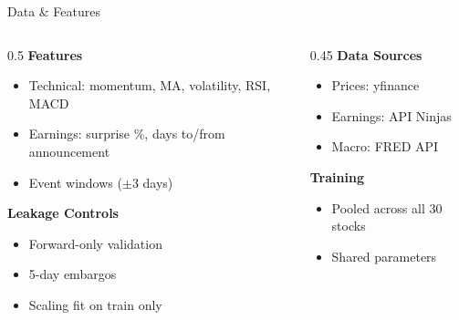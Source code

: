 \documentclass[aspectratio=169,xcolor={dvipsnames}]{beamer}
\begin{document}
\begin{frame}{Data \& Features}
  \begin{columns}[T]
    \begin{column}{0.5\textwidth}
      \textbf{Features}
      \begin{itemize}
        \item Technical: momentum, MA, volatility, RSI, MACD
        \item Earnings: surprise \%, days to/from announcement
        \item Event windows ($\pm$3 days)
      \end{itemize}
      
      \vspace{0.3cm}
      
      \textbf{Leakage Controls}
      \begin{itemize}
        \item Forward-only validation
        \item 5-day embargos
        \item Scaling fit on train only
      \end{itemize}
    \end{column}
    
    \begin{column}{0.45\textwidth}
      \textbf{Data Sources}
      \begin{itemize}
        \item Prices: yfinance
        \item Earnings: API Ninjas
        \item Macro: FRED API
      \end{itemize}
      
      \vspace{0.3cm}
      
      \textbf{Training}
      \begin{itemize}
        \item Pooled across all 30 stocks
        \item Shared parameters
      \end{itemize}
    \end{column}
  \end{columns}
\end{frame}
\end{document}
